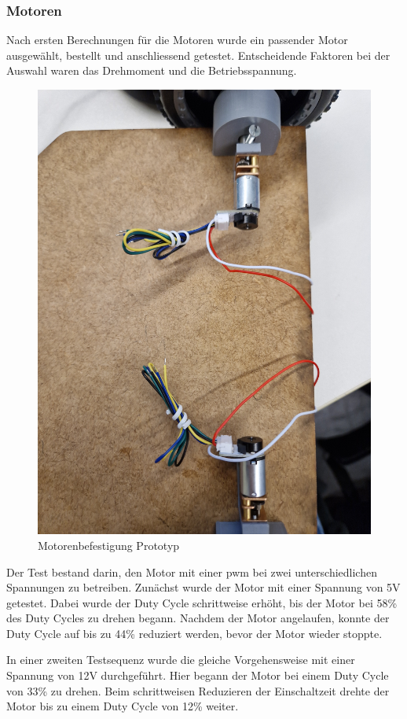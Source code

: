 \subsubsection{Motoren}

Nach ersten Berechnungen für die Motoren wurde ein passender Motor ausgewählt, bestellt und anschliessend getestet. Entscheidende Faktoren bei der Auswahl waren das Drehmoment und die Betriebsspannung.

\begin{figure}[H]
    \centering
    \includegraphics[width=0.8\linewidth]{img/Motorenaufbau.jpg}
    \caption{Motorenbefestigung Prototyp}
    \label{fig:Motorenaufbau}
\end{figure}

Der Test bestand darin, den Motor mit einer \acrfull{pwm} bei zwei unterschiedlichen Spannungen zu betreiben. Zunächst wurde der Motor mit einer Spannung von 5V getestet. Dabei wurde der Duty Cycle schrittweise erhöht, bis der Motor bei 58\% des Duty Cycles zu drehen begann. Nachdem der Motor angelaufen, konnte der Duty Cycle auf bis zu 44\% reduziert werden, bevor der Motor wieder stoppte.

In einer zweiten Testsequenz wurde die gleiche Vorgehensweise mit einer Spannung von 12V durchgeführt. Hier begann der Motor bei einem Duty Cycle von 33\% zu drehen. Beim schrittweisen Reduzieren der Einschaltzeit drehte der Motor bis zu einem Duty Cycle von 12\% weiter.

